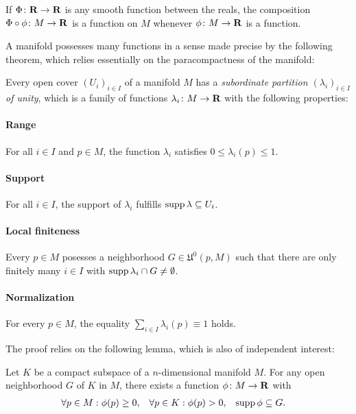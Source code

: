 If $\Phi\colon \mathbf{R} \to \mathbf{R}$ is any smooth function between the reals, 
the composition $\Phi \circ \phi\colon M \to \mathbf{R}$ is a function on $M$
whenever $\phi\colon M \to \mathbf{R}$ is a function.

A manifold possesses many functions in a sense made precise by the following theorem,
which relies essentially on the paracompactness of the manifold:
\begin{thm}
  \label{thm:paracompact_manifold}
  Every open cover $(U_i)_{i \in I}$ of a manifold $M$ has a
  \emph{subordinate
  partition $(\lambda_i)_{i \in I}$ of unity}, which is a family of functions
  $\lambda_i\colon M \to \mathbf{R}$ with the following properties:

  \paragraph{Range}
  For all $i \in I$ and $p \in M$, the function $\lambda_i$ satisfies $0 \leq \lambda_i(p)
  \leq 1$.
  
  \paragraph{Support}
  For all $i \in I$, the support of $\lambda_i$ fulfills $\operatorname{supp} \lambda \subseteq U_i$.
  
  \paragraph{Local finiteness}
  Every $p \in M$ posesses a neighborhood $G \in \mathfrak U^0(p, M)$ such that there
  are only finitely many $i \in I$ with $\operatorname{supp} \lambda_i \cap G \neq \emptyset$.
  
  \paragraph{Normalization}
  For every $p \in M$, the equality $\sum_{i \in I} \lambda_i(p) \equiv 1$ holds.
\end{thm}

The proof relies on the following lemma, which is also of independent interest:
\begin{lem}
  \label{lem:paracompact_manifold}
  Let $K$ be a compact subspace of a $n$-dimensional manifold $M$. For any open neighborhood
  $G$ of $K$ in $M$, there exists a function $\phi\colon M \to \mathbf{R}$ with
  \begin{align}
    \label{eq:paracompact_manifold}
    \forall p \in M: \phi(p) & \ge 0, &
    \forall p \in K: \phi(p) & > 0, &
    \operatorname{supp} \phi & \subseteq G.
  \end{align}
\end{lem}

